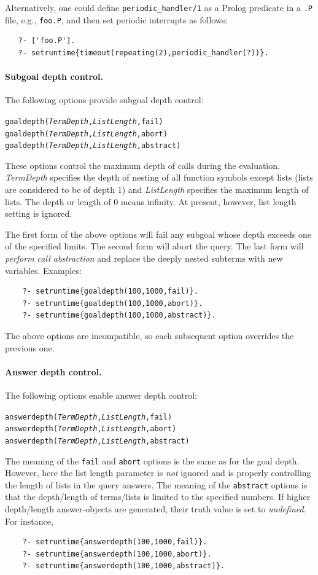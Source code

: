 \documentclass[11pt]{article}
\begin{document}
Alternatively, one could define \texttt{periodic\_handler/1} as a Prolog
predicate in a \texttt{.P} file, e.g., \texttt{foo.P}, and then set
periodic interrupts as follows:  
\begin{verbatim}
   ?- ['foo.P'].
   ?- setruntime{timeout(repeating(2),periodic_handler(?))}.
\end{verbatim}

\paragraph{Subgoal depth control.} The following options provide subgoal depth
control:
\begin{alltt}
    goaldepth(\emph{TermDepth},\emph{ListLength},fail)
    goaldepth(\emph{TermDepth},\emph{ListLength},abort)
    goaldepth(\emph{TermDepth},\emph{ListLength},abstract)
\end{alltt}
These options control the maximum depth of calls during the
evaluation. \emph{TermDepth} specifies the depth of nesting of all function
symbols except lists (lists are considered to be of depth 1) and
\emph{ListLength} specifies the maximum length of lists. The depth or
length of 0 means infinity.  At present, however, list length setting is
ignored.

The first form of the above options will fail any subgoal whose
depth exceeds one of the specified limits. The second form will abort the
query.  The last form will \emph{perform call abstraction} and replace the
deeply nested subterms with new variables. Examples:
\begin{verbatim}
    ?- setruntime{goaldepth(100,1000,fail)}.
    ?- setruntime{goaldepth(100,1000,abort)}.
    ?- setruntime{goaldepth(100,1000,abstract)}.
\end{verbatim}
The above options are incompatible, so each subsequent option overrides the
previous one.


\paragraph{Answer depth control.} The following options enable
answer depth control:
\begin{alltt}
    answerdepth(\emph{TermDepth},\emph{ListLength},fail)
    answerdepth(\emph{TermDepth},\emph{ListLength},abort)
    answerdepth(\emph{TermDepth},\emph{ListLength},abstract)
\end{alltt}
The meaning of the \texttt{fail} and \texttt{abort} options is the same as
for the goal depth. However, here the list length parameter is \emph{not}
ignored and is properly controlling the length of lists in the query answers.
The meaning of the \texttt{abstract} options is that the depth/length of
terms/lists is limited to the specified numbers. If higher depth/length
answer-objects are generated, their truth value is set to \emph{undefined}. 
For instance,
\begin{verbatim}
    ?- setruntime{answerdepth(100,1000,fail)}.
    ?- setruntime{answerdepth(100,1000,abort)}.
    ?- setruntime{answerdepth(100,1000,abstract)}.
\end{verbatim}
\end{document}
